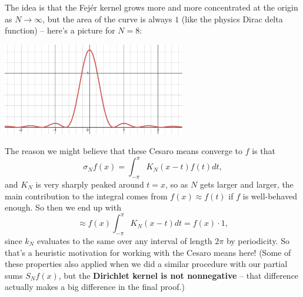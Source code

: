 The idea is that the Fej\'er kernel grows more and more concentrated at the origin as $N \to \infty$, but the area of the curve is always $1$ (like the physics Dirac delta function) -- here's a picture for $N = 8$:

\centerline{\includegraphics[width=8cm]{pictures/fejer.PNG}}

The reason we might believe that these Cesaro means converge to $f$ is that 
\[
    \sigma_N f(x) = \int_{-\pi}^\pi K_N(x-t) f(t) dt,
\]
and $K_N$ is very sharply peaked around $t = x$, so as $N$ gets larger and larger, the main contribution to the integral comes from $f(x) \approx f(t)$ if $f$ is well-behaved enough. So then we end up with 
\[
    \approx f(x) \int_{-\pi}^{\pi} K_N(x-t) dt = f(x) \cdot 1,
\]
since $k_N$ evaluates to the same over any interval of length $2\pi$ by periodicity. So that's a heuristic motivation for working with the Cesaro means here! (Some of these properties also applied when we did a similar procedure with our partial sums $S_Nf(x)$, but the \textbf{Dirichlet kernel is not nonnegative} -- that difference actually makes a big difference in the final proof.)

